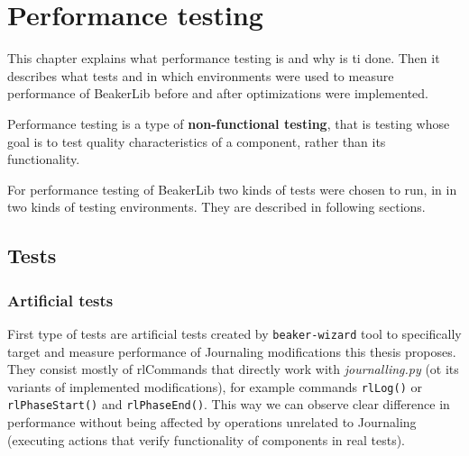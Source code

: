 \chapter{Performance testing}
\label{performance}

This chapter explains what performance testing is and why is ti done. Then it describes what tests and in which environments were used to measure performance of BeakerLib before and after optimizations were implemented.


Performance testing is a type of \textbf{non-functional testing}, that is testing whose goal is to test quality characteristics of a component, rather than its functionality\cite{non-functional_testing}.

For performance testing of BeakerLib two kinds of tests were chosen to run, in in two kinds of testing environments. They are described in following sections.

\section{Tests}

\subsection{Artificial tests}
First type of tests are artificial tests created by \texttt{beaker-wizard} tool to specifically target and measure performance of Journaling modifications this thesis proposes. They consist mostly of rlCommands that directly work with \textit{journalling.py} (ot its variants of implemented modifications), for example commands \texttt{rlLog()} or \texttt{rlPhaseStart()} and \texttt{rlPhaseEnd()}. This way we can observe clear difference in performance without being affected by operations unrelated to Journaling (executing actions that verify functionality of components in real tests). 


